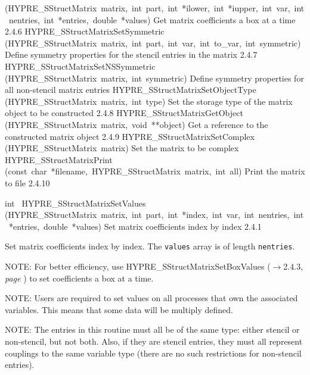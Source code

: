 \documentclass{article}
\begin{document}
\begin{cxxentry}
\begin{cxxentry}
\begin{cxxnames}
        {(HYPRE\_SStructMatrix\ matrix,\ int\ part,\ int\ *ilower,\ int\ *iupper,\ int\ var,\ int\ nentries,\ int\ *entries,\ double\ *values)}
        {
Get matrix coefficients a box at a time}
        {2.4.6}
        {HYPRE\_SStructMatrixSetSymmetric}
        {(HYPRE\_SStructMatrix\ matrix,\ int\ part,\ int\ var,\ int\ to\_var,\ int\ symmetric)}
        {
Define symmetry properties for the stencil entries in the matrix}
        {2.4.7}
        {HYPRE\_SStructMatrixSetNSSymmetric}
        {(HYPRE\_SStructMatrix\ matrix,\ int\ symmetric)}
        {
Define symmetry properties for all non-stencil matrix entries}
        {}
\label{cxx.2.4.16}
        {HYPRE\_SStructMatrixSetObjectType}
        {(HYPRE\_SStructMatrix\ matrix,\ int\ type)}
        {
Set the storage type of the matrix object to be constructed}
        {2.4.8}
        {HYPRE\_SStructMatrixGetObject}
        {(HYPRE\_SStructMatrix\ matrix,\ void\ **object)}
        {
Get a reference to the constructed matrix object}
        {2.4.9}
        {HYPRE\_SStructMatrixSetComplex}
        {(HYPRE\_SStructMatrix\ matrix)}
        {
Set the matrix to be complex}
        {}
\label{cxx.2.4.17}
        {HYPRE\_SStructMatrixPrint}
        {(const\ char\ *filename,\ HYPRE\_SStructMatrix\ matrix,\ int\ all)}
        {
Print the matrix to file}
        {2.4.10}
\end{cxxnames}
\begin{cxxfunction}
{int\ }
        {HYPRE\_SStructMatrixSetValues}
        {(HYPRE\_SStructMatrix\ matrix,\ int\ part,\ int\ *index,\ int\ var,\ int\ nentries,\ int\ *entries,\ double\ *values)}
        {
Set matrix coefficients index by index}
        {2.4.1}
\begin{cxxdoc}

Set matrix coefficients index by index.  The {\tt values} array is of length
{\tt nentries}.

NOTE: For better efficiency, use HYPRE\_SStructMatrixSetBoxValues ($\rightarrow$2.4.3, {\em page \pageref{cxx.2.4.3}}) to set
coefficients a box at a time.

NOTE: Users are required to set values on all processes that own the
associated variables.  This means that some data will be multiply defined.

NOTE: The entries in this routine must all be of the same type: either
stencil or non-stencil, but not both.  Also, if they are stencil entries,
they must all represent couplings to the same variable type (there are no
such restrictions for non-stencil entries).


\end{cxxdoc}
\end{cxxfunction}
\end{cxxentry}
\end{cxxentry}
\end{document}
